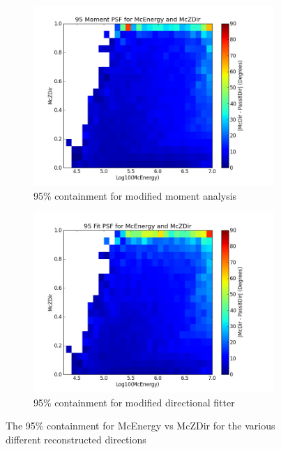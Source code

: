 \documentclass[11pt]{article}
\begin{document}
\begin{figure}[h]
\begin{subfigure}[b]{0.5\textwidth}
                \label{con95_pass8}
        \end{subfigure}
                \begin{subfigure}[b]{0.5\textwidth}
                \centering
                \includegraphics[width=\textwidth]{psf95_2D_moment}
                \caption{95\% containment for modified moment analysis}
                \label{con95_moment}
        \end{subfigure}%
        \begin{subfigure}[b]{0.5\textwidth}
                \centering
                \includegraphics[width=\textwidth]{psf95_2D_fit}
                \caption{95\% containment for modified directional fitter}
                \label{con95_fit}
        \end{subfigure}
        \caption{The 95\% containment for McEnergy vs McZDir for the various different reconstructed directions }
        \label{con95}
\end{figure}
\end{document}
